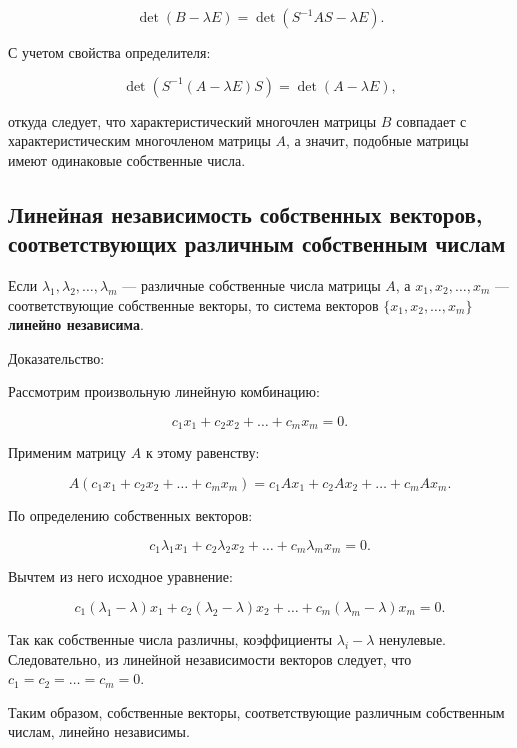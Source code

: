 {\[
\det(B - \lambda E) = \det(S^{-1} A S - \lambda E).
\]



С учетом свойства определителя:



\[
\det(S^{-1} (A - \lambda E) S) = \det(A - \lambda E),
\]



откуда следует, что характеристический многочлен матрицы $B$ совпадает с характеристическим многочленом матрицы $A$, а значит, подобные матрицы имеют одинаковые собственные числа.

\subsection*{Линейная независимость собственных векторов, соответствующих различным собственным числам}

Если $\lambda_1, \lambda_2, \dots, \lambda_m$ — различные собственные числа матрицы $A$, а $x_1, x_2, \dots, x_m$ — соответствующие собственные векторы, то система векторов $\{x_1, x_2, \dots, x_m\}$ \textbf{линейно независима}.

Доказательство:

Рассмотрим произвольную линейную комбинацию:



\[
c_1 x_1 + c_2 x_2 + \dots + c_m x_m = 0.
\]



Применим матрицу $A$ к этому равенству:



\[
A (c_1 x_1 + c_2 x_2 + \dots + c_m x_m) = c_1 A x_1 + c_2 A x_2 + \dots + c_m A x_m.
\]



По определению собственных векторов:



\[
c_1 \lambda_1 x_1 + c_2 \lambda_2 x_2 + \dots + c_m \lambda_m x_m = 0.
\]



Вычтем из него исходное уравнение:



\[
c_1 (\lambda_1 - \lambda) x_1 + c_2 (\lambda_2 - \lambda) x_2 + \dots + c_m (\lambda_m - \lambda) x_m = 0.
\]



Так как собственные числа различны, коэффициенты $\lambda_i - \lambda$ ненулевые. Следовательно, из линейной независимости векторов следует, что $c_1 = c_2 = \dots = c_m = 0$.

Таким образом, собственные векторы, соответствующие различным собственным числам, линейно независимы.

}